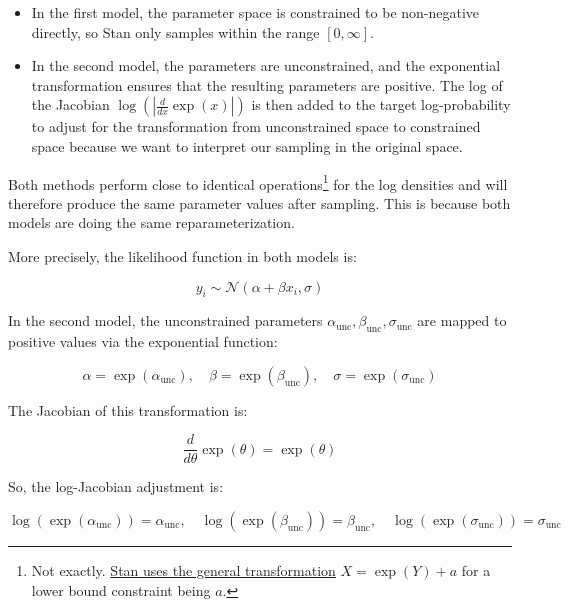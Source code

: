 \documentclass[
  letterpaper,
  DIV=11,
  numbers=noendperiod]{scrartcl}
\providecommand{\tightlist}{%
  \setlength{\itemsep}{0pt}\setlength{\parskip}{0pt}}\usepackage{longtable,booktabs,array}
\begin{document}
\begin{itemize}
\tightlist
\item
  In the first model, the parameter space is constrained to be
  non-negative directly, so Stan only samples within the range
  \([0, \infty]\).
\item
  In the second model, the parameters are unconstrained, and the
  exponential transformation ensures that the resulting parameters are
  positive. The log of the Jacobian
  \(\log \left( \left| \frac{d}{dx} \exp(x) \right| \right)\) is then
  added to the target log-probability to adjust for the transformation
  from unconstrained space to constrained space because we want to
  interpret our sampling in the original space.
\end{itemize}

Both methods perform close to identical operations\footnote{Not exactly.
  \href{https://mc-stan.org/docs/reference-manual/transforms.html\#lower-bound-transform.section}{Stan
  uses the general transformation} \(X = \exp(Y) + a\) for a lower bound
  constraint being \(a\).} for the log densities and will therefore
produce the same parameter values after sampling. This is because both
models are doing the same reparameterization.

More precisely, the likelihood function in both models is:

\[
y_i \sim \mathcal{N}(\alpha + \beta x_i, \sigma)
\]

In the second model, the unconstrained parameters
\(\alpha_{\text{unc}}, \beta_{\text{unc}}, \sigma_{\text{unc}}\) are
mapped to positive values via the exponential function:

\[
\alpha = \exp(\alpha_{\text{unc}}), \quad \beta = \exp(\beta_{\text{unc}}), \quad \sigma = \exp(\sigma_{\text{unc}})
\]

The Jacobian of this transformation is:

\[
\frac{d}{d\theta} \exp(\theta) = \exp(\theta)
\]

So, the log-Jacobian adjustment is:

\[
\log(\exp(\alpha_{\text{unc}})) = \alpha_{\text{unc}}, \quad \log(\exp(\beta_{\text{unc}})) = \beta_{\text{unc}}, \quad \log(\exp(\sigma_{\text{unc}})) = \sigma_{\text{unc}}
\]
\end{document}
